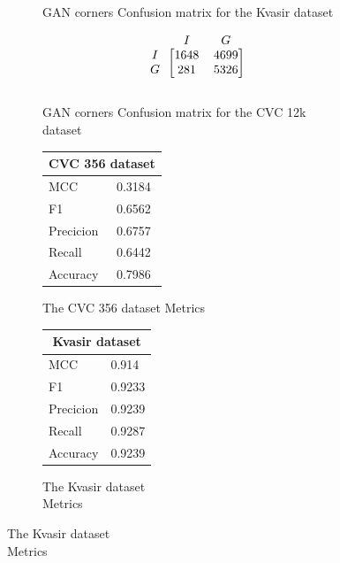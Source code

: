 \begin{figure}
\begin{subfigure}[b]{0.49\textwidth}
        
\caption{GAN corners Confusion matrix for the Kvasir dataset}
\label{mat:kvasir_CM_DN121_GAN_CORNER}
\end{subfigure}
\begin{subfigure}[b]{0.25\textwidth}
        \[
\begin{blockarray}{ccc}
& I & G  \\
\begin{block}{c[cc]}
 		I&1648 & 4699\\
        G&281  & 5326\\
\end{block}
\end{blockarray}
\]   
\caption{GAN corners Confusion matrix for the CVC 12k dataset}
\label{mat:cvc12k_CM_DN121_GAN_CORNER}
\end{subfigure}
\caption{Confusion matrices for the three datasets}
\label{mat:CM_DN121_GAN_CORNER}
\begin{subfigure}[b]{0.25\textwidth}
\begin{tabular}{ll}      
        \toprule
        \multicolumn{2}{c}{CVC 356 dataset}        \\
        \midrule
        MCC 		& 0.3184 \\
        F1  		& 0.6562 \\
        Precicion  	& 0.6757 \\
        Recall     	& 0.6442 \\
        Accuracy	& 0.7986 \\
        \bottomrule
        \end{tabular}
\caption{The CVC 356 dataset Metrics}
\label{tab:cvc356_metrics_DN121_GAN_CORNER}
\end{subfigure}%
\begin{subfigure}[b]{0.49\textwidth}
    	\centering
        \begin{tabular}{ll}
        \toprule
        \multicolumn{2}{c}{Kvasir dataset}        \\
        \midrule
        MCC 		& 0.914 \\
        F1  		& 0.9233 \\
        Precicion  	& 0.9239 \\
        Recall     	& 0.9287 \\
        Accuracy	& 0.9239 \\
        \bottomrule
\end{tabular}
\caption{The Kvasir dataset\\ Metrics}
\label{tab:kvasir_metrics_DN121_GAN_CORNER}
\end{subfigure}%

\end{figure}

